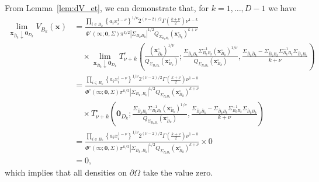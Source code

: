\documentclass[12pt]{article}
\begin{document}
From Lemma~\ref{lem:dV_et}, we can demonstrate that, for $k = 1, \ldots, D-1$ we have 
%
\begin{align*}
\lim_{\bm x_{\bar{B}_k} \downarrow \bm 0_{D_k}} V_{B_k}(\bm x) 
&= \frac{\prod_{i\in B_k} \left\{a_i x_i^{1-\nu} \right\}^{1/\nu} 2^{(\nu-2)/2} \Gamma \left(\frac{k+\nu}{2}\right) \nu^{1-k}}{\Phi^\circ(\bm \infty;\bm 0, \Sigma) \pi^{k/2}|\Sigma_{B_kB_k}|^{1/2}Q_{\Sigma_{B_k B_k}}\left(\bm x_{B_k}^\circ\right)^{k+\nu}} \\
&\quad \times \lim_{\bm x_{\bar{B}_k} \downarrow \bm 0_{D_k}}
T^\circ_{\nu+k}\left(\frac{\left(\bm x_{\bar{B}_k}^\circ\right)^{1/\nu}}{Q_{\Sigma_{B_k B_k}}\left(\bm x_{B_k}^\circ\right)};\frac{\Sigma_{\bar{B}_k B_k}\Sigma_{B_k B_k}^{-1}\left(\bm x_{B_k}^\circ\right)^{1/\nu}}{Q_{\Sigma_{B_k B_k}}\left(\bm x_{B_k}^\circ\right)},\frac{\Sigma_{\bar{B}_k \bar{B}_k}-\Sigma_{\bar{B}_k B_k}\Sigma_{B_k B_k}^{-1}\Sigma_{\bar{B}_k B_k}}{k+\nu}\right) \\
&= \frac{\prod_{i\in B_k} \left\{a_i x_i^{1-\nu} \right\}^{1/\nu} 2^{(\nu-2)/2} \Gamma \left(\frac{k+\nu}{2}\right) \nu^{1-k}}{\Phi^\circ(\bm \infty;\bm 0, \Sigma) \pi^{k/2}|\Sigma_{B_k,B_k}|^{1/2}Q_{\Sigma_{B_k B_k}}\left(\bm x_{B_k}^\circ\right)^{k+\nu}} \\
&\quad \times T^\circ_{\nu+k}\left(\bm 0_{D_k};\frac{\Sigma_{\bar{B}_k B_k}\Sigma_{B_k B_k}^{-1}\left(\bm x_{B_k}^\circ\right)^{1/\nu}}{Q_{\Sigma_{B_k B_k}}\left(\bm x_{B_k}^\circ\right)},\frac{\Sigma_{\bar{B}_k \bar{B}_k}-\Sigma_{\bar{B}_k B_k}\Sigma_{B_k B_k}^{-1}\Sigma_{\bar{B}_k B_k}}{k+\nu}\right) \\
&= \frac{\prod_{i\in B_k} \left\{a_i x_i^{1-\nu} \right\}^{1/\nu} 2^{(\nu-2)/2} \Gamma \left(\frac{k+\nu}{2}\right) \nu^{1-k}}{\Phi^\circ(\bm \infty;\bm 0, \Sigma) \pi^{k/2}|\Sigma_{B_k,B_k}|^{1/2}Q_{\Sigma_{B_k B_k}}\left(\bm x_{B_k}^\circ\right)^{k+\nu}} \times 0 \\
&= 0,
\end{align*}
%
which implies that all densities on $\partial\Omega$ take the value zero. 
\end{document}
